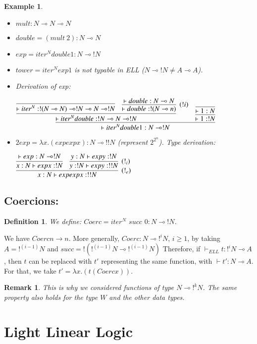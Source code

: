 \documentclass[a4paper,10pt]{article}
\newcommand{\limpl}{\multimap}  %
\newtheorem{definition}{Definition}
\newtheorem{ex}{Example}
\newtheorem{rmk}{Remark}
\begin{document}
\begin{ex}
\begin{itemize}
\item $mult: N \limpl N \limpl N$
\item $double=(mult\ 2): N \limpl N$
\item $exp=iter^N double 1: N \limpl !N$
\item $tower=iter^N exp 1$ is not typable in ELL ($N\limpl !N \neq A\limpl A$).
\item Derivation of exp:
\begin{center}
$	\infer{\vdash iter^N double 1: N \limpl !N}{
		\infer{\vdash iter^N double: !N \limpl N \limpl !N}{
			\infer{\vdash iter^N: !(N\limpl N) \limpl !N \limpl N \limpl !N}{}
			&
			\infer[(!i)]{\vdash double:!(N\limpl n)}{\vdash double:N\limpl N}
		}
		&
		\infer{\vdash 1:!N}{\infer{\vdash 1:N}{}}
	}$
\end{center}

\item $2exp= \lambda x.(exp exp x): N \limpl !!N$ (represent $2^{2^{n}}$). Type derivation:
\begin{center}
$	\infer[(!_e)]{x:N \vdash exp exp x: !!N}{
		\infer{x:N \vdash exp x: !N}{\vdash exp:N \limpl !N}
		&
		\infer[(!_i)]{y:!N \vdash exp y:!!N}{y:N \vdash exp y:!N}
	}$
\end{center}
\end{itemize}

\end{ex}


\subsection{Coercions:}
\begin{definition}
We define: $Coerc = iter^N$ $succ$ $0: N \limpl !N$.
\end{definition}

 We have $Coerc n \rightarrow n$.
 More generally, $Coerc: N \limpl !^i N$, $i\geq 1$, by taking $A=!^{(i-1)} N$ and $succ=!(!^{(i-1)} N \limpl !^{(i-1)} N)$
 Therefore, if $\vdash_{ELL} t: !^{i} N \limpl A$, then $t$ can be replaced with $t'$ representing the same function, with $\vdash t':N \limpl A$. For that, we take $t' = \lambda x.(t (Coerc x))$.

\begin{rmk}
This is why we considered functions of type $N \limpl !^k N$. The same property also holds for the type $W$ and the other data types.
\end{rmk}



\newpage

\section{Light Linear Logic}


\end{document}
